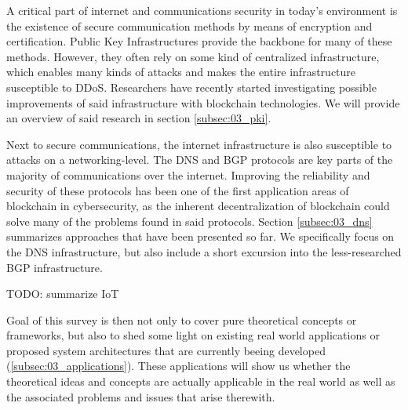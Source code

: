 A critical part of internet and communications security in today's environment is the existence of secure communication methods by means of encryption and certification. Public Key Infrastructures provide the backbone for many of these methods. However, they often rely on some kind of centralized infrastructure, which enables many kinds of attacks and makes the entire infrastructure susceptible to DDoS. Researchers have recently started investigating possible improvements of said infrastructure with blockchain technologies. We will provide an overview of said research in section \ref{subsec:03_pki}.

Next to secure communications, the internet infrastructure is also susceptible to attacks on a networking-level. The DNS and BGP protocols are key parts of the majority of communications over the internet. Improving the reliability and security of these protocols has been one of the first application areas of blockchain in cybersecurity, as the inherent decentralization of blockchain could solve many of the problems found in said protocols. Section \ref{subsec:03_dns} summarizes approaches that have been presented so far. We specifically focus on the DNS infrastructure, but also include a short excursion into the less-researched BGP infrastructure.

TODO: summarize IoT

Goal of this survey is then not only to cover pure theoretical concepts or frameworks, but also to shed some light on existing real world applications or proposed system architectures that are currently beeing developed (\ref{subsec:03_applications}). These applications will show us whether the theoretical ideas and concepts are actually applicable in the real world as well as the associated problems and issues that arise therewith.
